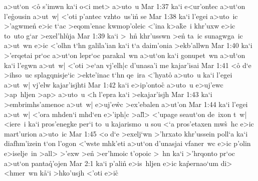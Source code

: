 a>ut`on
<o\r{}
s'imwn
ka`i
o<i
met>
a>uto~u\bibvsend
\vs Mar 1:37
ka`i
e<ur'on\r{t}ec
a>ut`on
l'e\r{g}ousin
a>ut~w|
<'oti
p'antec
vzhto~us'in\r{}
se\bibvsend
\vs Mar 1:38
ka`i
l'egei
a>uto~ic
>'agwme\r{n}
e>ic
t`ac
>eqom'enac
kwmop'oleic
<'ina
k>a\r{k}e~i
khr'uxw
e>ic
to~uto
g`ar
>exel'hl\r{u}ja\bibvsend
{}
\vs Mar 1:39
ka`i
>~h\r{n}
khr'usswn
>en\r{}
ta~ic
sunagwga~ic
a>ut~wn
e>ic
<'olhn
t`hn
galila'ian
ka`i
t`a
daim'onia
>ekb'allwn\bibvsend
\vs Mar 1:40
ka`i
>'erqetai
pr`oc
a>ut`on
lepr`oc
parakal~wn
a>ut`on
ka`i
gonupet~wn
a>u\r{t}`on
ka`i
l'egwn
a>ut~w|
<'oti
>e`an
vj'elh|c
d'unasa'i
me
kajar'isai\bibvsend
\vs Mar 1:41
<o\r{}
d`e
>ihso~uc
splagqnisje`ic
>ekte'inac
t`hn
qe~ira
<'hyato\r{}
a>uto~u
ka`i
l'egei
a>ut~w|
vj'elw
kajar'isjhti\bibvsend
\vs Mar 1:42
ka`i
e>ip'ontoc\r{}
a>uto~u
e>uj'ewc
>ap~hljen
>ap>
a>uto~u
<h
l'epra
ka`i
>ekajar'isjh\bibvsend
\vs Mar 1:43
ka`i
>embrimhs'amenoc
a>ut~w|
e>uj'e\r{w}c
>ex'ebalen
a>ut'on\bibvsend
\vs Mar 1:44
ka`i
l'egei
a>ut~w|
<'ora
mhden`i
mhd`en
e>'iph|c
>al\r{l}>
<'upage
seaut`on
de~ixon
t~w|
<iere~i
ka`i
pros'enegke
per`i
to~u
kajarismo~u
sou
<`a
pros'etaxen
mw\r{s}~hc
e>ic
mart'urion
a>uto~ic\bibvsend
\vs Mar 1:45
<o
d`e
>exelj`wn
>'hrxato
khr'ussein
poll`a
ka`i
diafhm'izein
t`on
l'ogon
<'wste
mhk'eti
a>ut`on
d'unasjai
vfaner~wc
e>ic
p'olin
e>iselje~in
>all>
>'exw
>e\r{n}
>er'hmoic
t'opoic
>~hn
ka`i
>'hrqonto
pr`oc
a>ut`on
panta\r{q}'ojen\bibvsend
{}
\vs Mar 2:1
ka`i
p'alin\r{}
e>is~hljen
e>ic
ka\r{p}ernao`um
di>
<hmer~wn
k\r{a}`i
>hko'usjh
<'oti
e>ic\r{}
